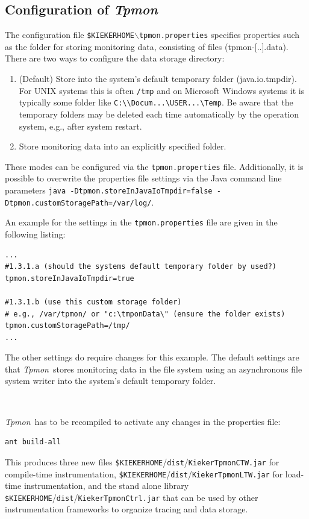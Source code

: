 \documentclass[a4paper,12pt]{scrartcl}
\newcommand{\tpmon}{\textit{Tpmon}}
\begin{document}
\subsection{Configuration of \tpmon}
The configuration file \texttt{\$KIEKERHOME}$\backslash$\texttt{tpmon.properties} specifies properties such as the folder for storing monitoring data, consisting of files (tpmon-[..].data). There are two ways to configure the data storage directory: 
\begin{enumerate}
\item (Default) Store into the system's default temporary folder (java.io.tmpdir). For UNIX systems this is often \texttt{/tmp} and on Microsoft Windows systems it is typically some folder like \verb=C:\\Docum...\USER...\Temp=. Be aware that the temporary folders may be deleted each time automatically by the operation system, e.g., after system restart.
\item Store monitoring data into an explicitly specified folder.
\end{enumerate}
These modes can be configured via the \texttt{tpmon.properties} file. Additionally, it is possible to overwrite the properties file settings via the Java command line parameters \footnotesize \texttt{java -Dtpmon.storeInJavaIoTmpdir=false -Dtpmon.customStoragePath=/var/log/}. \normalsize

An example for the settings in the \texttt{tpmon.properties} file are given in the following listing:
\begin{lstlisting}[caption={Linux/Unix: Specification of the monitoring data storage location}]
...
#1.3.1.a (should the systems default temporary folder by used?)
tpmon.storeInJavaIoTmpdir=true

#1.3.1.b (use this custom storage folder)
# e.g., /var/tpmon/ or "c:\tmponData\" (ensure the folder exists)
tpmon.customStoragePath=/tmp/
...
\end{lstlisting}

The other settings do require changes for this example. The default settings are that \tpmon\ stores monitoring data in the file system using an asynchronous file system writer into the system's default temporary folder.

\

\tpmon\ has to be recompiled to activate any changes in the properties file:
\begin{lstlisting}[]
ant build-all
\end{lstlisting}
This produces three new files \texttt{\$KIEKERHOME}/\texttt{dist}/\texttt{KiekerTpmonCTW.jar} for compile-time instrumentation, \texttt{\$KIEKERHOME}/\texttt{dist}/\texttt{KiekerTpmonLTW.jar} for load-time instrumentation, and the stand alone library \texttt{\$KIEKERHOME}/\texttt{dist}/\texttt{KiekerTpmonCtrl.jar} that can be used by other instrumentation frameworks to organize tracing and data storage.
\end{document}
